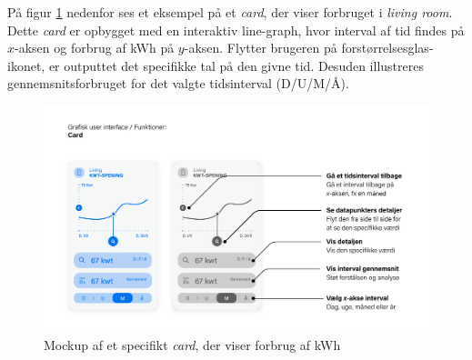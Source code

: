 På figur \ref{img:teknisk:card} nedenfor ses et eksempel på et \emph{card}, der viser forbruget i \emph{living room}. Dette \emph{card} er opbygget med en interaktiv line-graph, hvor interval af tid findes på $x$-aksen og forbrug af kWh på $y$-aksen. Flytter brugeren på forstørrelsesglas-ikonet, er outputtet det specifikke tal på den givne tid. Desuden illustreres gennemsnitsforbruget for det valgte tidsinterval (D/U/M/Å).
\begin{figure}[H]
    \centering
    \includegraphics[width=\textwidth]{Images/Main Board - Card.png}
    \caption[\emph{Card} mockup]{Mockup af et specifikt \emph{card}, der viser forbrug af kWh}
    \label{img:teknisk:card}
\end{figure}
\newpage

